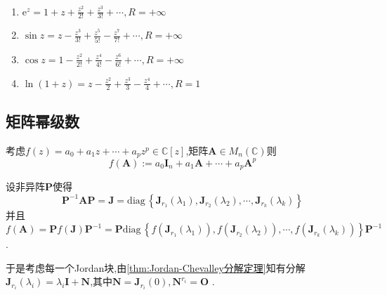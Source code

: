 \begin{formal}
    \begin{proposition}[常见复幂级数及其收敛半径]\label{prop:常见复幂级数及其收敛半径}
        \,

        \begin{enumerate}[label={\textup{(\arabic*)}}]
            \item $\displaystyle \mathrm{e}^z=1+z+\frac{z^2}{2!}+\frac{z^3}{3!}+\cdots,R=+\infty$
            \item $\displaystyle \sin z=z-\frac{z^3}{3!}
            +\frac{z^5}{5!}-\frac{z^7}{7!}+\cdots,R=+\infty
            $
            \item $\displaystyle \cos z=1-\frac{z^2}{2!}+\frac{z^4}{4!}-\frac{z^6}{6!}+\cdots,R=+\infty$
            \item $\ln \left(1+z\right)=
            z-\frac{z^2}{2}+\frac{z^3}{3}-\frac{z^4}{4}+\cdots,R=1
            $
        \end{enumerate}
    \end{proposition}
\end{formal}
\subsection{矩阵幂级数}
考虑$f\left(z\right)=a_0+a_1z+\cdots+a_pz^p\in \mathbb{C}\left[z\right]$,矩阵$\bm{A}\in M_n\left(\mathbb{C}\right)$则\[
f\left(\bm{A}\right):=a_0\bm{I}_n+a_1\bm{A}+\cdots+a_p\bm{A}^p
\]

设非异阵$\bm{P}$使得\[
\bm{P}^{-1}\bm{A}\bm{P}=\bm{J}= \mathrm{diag}\,\left\{
    \bm{J}_{r_1}\left(\lambda_1\right),\bm{J}_{r_2}\left(\lambda_2\right),\cdots,\bm{J}_{r_k}\left(\lambda_k\right)
\right\}
\]并且$f\left(\bm{A}\right)=\bm{P}f\left(\bm{J}\right)\bm{P}^{-1}=\bm{P}\mathrm{diag}\,\left\{
    f\left(
      \bm{J}_{r_1}\left(\lambda_1\right)
    \right),f\left(
        \bm{J}_{r_2}\left(\lambda_2\right)
    \right),\cdots,f\left(
        \bm{J}_{r_k}\left(\lambda_k\right)
    \right)
\right\}\bm{P}^{-1}$.

于是考虑每一个Jordan块,由\cref{thm:Jordan-Chevalley分解定理}知有分解$\bm{J}_{r_i}\left(\lambda_i\right)=\lambda_i\bm{I}+\bm{N}$,其中$\bm{N}=\bm{J}_{r_i}\left(0\right),\bm{N}^{r_i}=\bm{O}$ .

